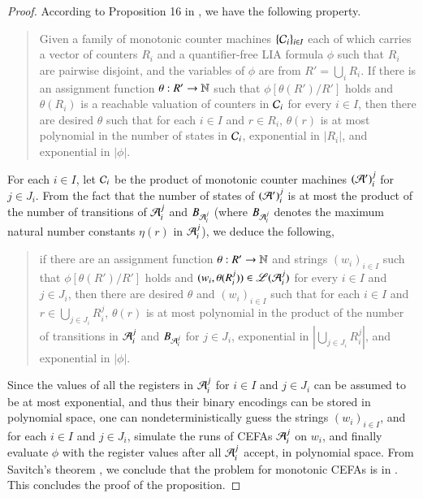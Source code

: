 \begin{proof}
	According to Proposition 16 in \cite{LB16}, we have the following property. 
	\begin{quote}
		Given a family of monotonic counter machines $\{ \mathcal{C}_i \}_{i\in I}$ each of which carries a vector of counters $R_i$ and a quantifier-free LIA formula $\phi$ such that $ R_i$ are pairwise disjoint,  and the variables of $\phi$ are from $R'=\bigcup_{i} R_i$. If there is an assignment function $\theta: R' \rightarrow \mathbb{N}$ such that $\phi[\theta(R' )/R']$ holds and $\theta(R_i)$ is a reachable valuation of counters in $\mathcal{C}_i$ for every $i \in I$, then there are desired $\theta$ such that for each $i \in I$ and $r \in R_i$, $\theta(r)$ is at most polynomial in the number of states in $\mathcal{C}_i $, exponential in $|R_i|$, and exponential in $|\phi|$.
	\end{quote}
	For each $i \in I$, let $\mathcal{C}_i$ be the product of monotonic counter machines $(\mathcal{A}')_i^j$ for $j \in J_i$. 
	From the fact that the number of states of $(\mathcal{A}')_i^j$ is at most the product of the number of transitions of $\mathcal{A}_i^j$ and $B_{\mathcal{A}_i^j}$ (where $B_{\mathcal{A}_i^j}$ denotes the maximum natural number constants $\eta(r)$ in $\mathcal{A}_i^j$), we deduce the following,
	\begin{quote}
		if there are an assignment function $\theta: R' \rightarrow \mathbb{N}$ and strings $(w_i)_{i \in I}$ such that  $\phi[\theta(R' )/R']$ holds and $(w_i, \theta(R_i^j)) \in \mathscr{L}(\mathcal{A}_i^j)$ for every $i \in I$ and $j \in J_i$, then there are desired $\theta$ and $(w_i)_{i \in I}$ such that for each $i \in I$ and $r \in \bigcup_{j \in J_i} R^j_i$, $\theta(r)$ is at most polynomial in the product of the number of transitions in $\mathcal{A}_i^j$ and $B_{\mathcal{A}_i^j}$ for $j \in J_i$, exponential in $\left|\bigcup_{j \in J_i} R^j_i \right|$, and exponential in $|\phi|$.
	\end{quote}
	
	Since the values of all the registers in $\mathcal{A}_i^j$ for $i \in I$ and $ j \in J_i$ can be assumed to be at most exponential, and thus their binary encodings can be stored in polynomial space, one can nondeterministically guess the strings $(w_i)_{i \in I}$, and for each $i \in I$ and $j \in J_i$, simulate the runs of CEFAs $\mathcal{A}_i^j$ on $w_i$, and finally evaluate $\phi$ with the register values after all $\mathcal{A}_{i}^{j}$ accept, in polynomial space. From Savitch's theorem \cite{complexity-book}, we conclude that the {\lasat} problem for monotonic CEFAs is in {\pspace}. This concludes the proof of the proposition.
\end{proof}


